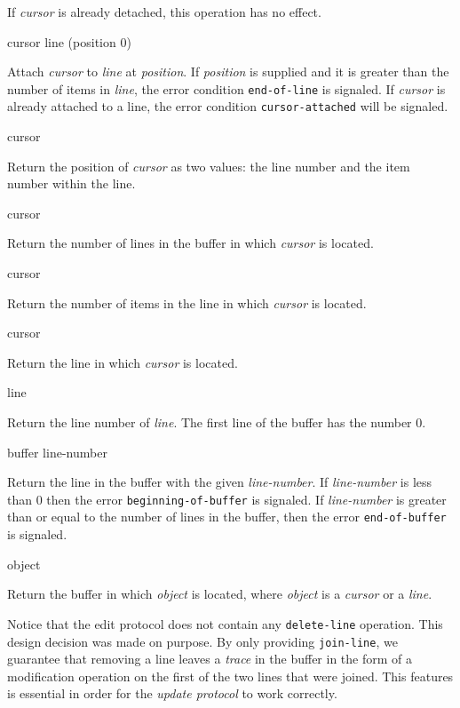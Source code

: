 If \textit{cursor} is already detached, this operation has no effect.

 {cursor line \optional (position 0)}

Attach \textit{cursor} to \textit{line} at \textit{position}.  If
\textit{position} is supplied and it is greater than the number of
items in \textit{line}, the error condition \texttt{end-of-line} is
signaled.  If \textit{cursor} is already attached to a line, the error
condition \texttt{cursor-attached} will be signaled.

 {cursor}

Return the position of \textit{cursor} as two values: the line number
and the item number within the line. 

 {cursor}

Return the number of lines in the buffer in which \textit{cursor} is
located.

 {cursor}

Return the number of items in the line in which \textit{cursor} is
located.

 {cursor}

Return the line in which \textit{cursor} is located. 

 {line}

Return the line number of \textit{line}.  The first line of the buffer
has the number $0$. 

 {buffer line-number}

Return the line in the buffer with the given \textit{line-number}.  If
\textit{line-number} is less than $0$ then the error
\texttt{beginning-of-buffer} is signaled.  If \textit{line-number} is
greater than or equal to the number of lines in the buffer, then the
error \texttt{end-of-buffer} is signaled.

 {object}

Return the buffer in which \textit{object} is located, where
\textit{object} is a \emph{cursor} or a \emph{line}.

Notice that the edit protocol does not contain any
\texttt{delete-line} operation.  This design decision was made on
purpose.  By only providing \texttt{join-line}, we guarantee that
removing a line leaves a \emph{trace} in the buffer in the form of a
modification operation on the first of the two lines that were
joined.  This features is essential in order for the \emph{update
  protocol} to work correctly.

